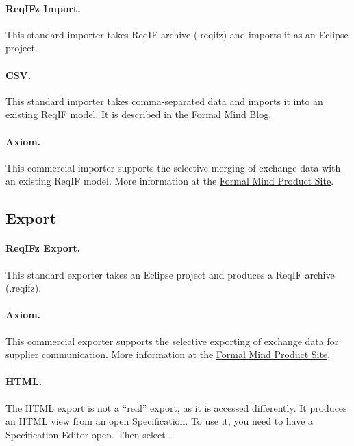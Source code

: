 \paragraph{ReqIFz Import.} This standard importer takes ReqIF archive (.reqifz) and imports it as an Eclipse project.

\paragraph{CSV.} This standard importer takes comma-separated data and imports it into an existing ReqIF model.  It is described in the \href{http://formalmind.com/blog/new-stuff-new-committer-new-product-new-importer-new-release}{Formal Mind Blog}.

\paragraph{Axiom.} This commercial importer supports the selective merging of exchange data with an existing ReqIF model.  More information at the \href{http://formalmind.com/axiom}{Formal Mind Product Site}.

\subsection{Export}

\paragraph{ReqIFz Export.} This standard exporter takes an Eclipse project and produces a ReqIF archive (.reqifz).

\paragraph{Axiom.} This commercial exporter supports the selective exporting of exchange data for supplier communication.  More information at the \href{http://formalmind.com/axiom}{Formal Mind Product Site}.

\paragraph{HTML.} The HTML export is not a ``real'' export, as it is accessed differently.  It produces an HTML view from an open Specification.  To use it, you need to have a Specification Editor open.  Then select .

